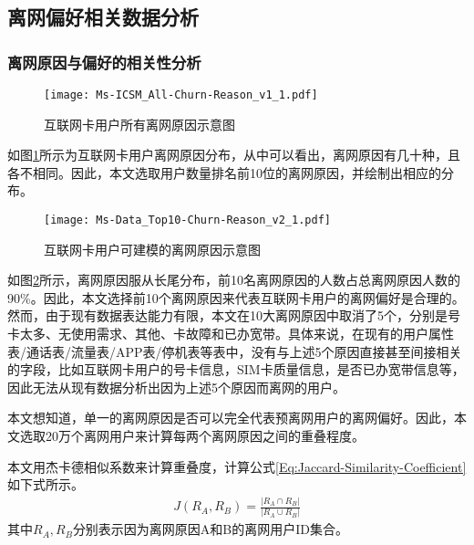 \subsection{离网偏好相关数据分析}
\subsubsection{离网原因与偏好的相关性分析}
\begin{figure}[!hbt]
	\centering
	\texttt{[image: Ms-ICSM\_All-Churn-Reason\_v1\_1.pdf]}
	\caption{互联网卡用户所有离网原因示意图}
	\label{Fig:All-Churn-Reason}
\end{figure}
如图\ref{Fig:All-Churn-Reason}所示为互联网卡用户离网原因分布，从中可以看出，离网原因有几十种，且各不相同。因此，本文选取用户数量排名前10位的离网原因，并绘制出相应的分布。

\begin{figure}[hbt]
	\centering
	\texttt{[image: Ms-Data\_Top10-Churn-Reason\_v2\_1.pdf]}
	\caption{互联网卡用户可建模的离网原因示意图}
	\label{Fig:ICSM-Top10-Churn-Reason}
\end{figure}
如图\ref{Fig:ICSM-Top10-Churn-Reason}所示，离网原因服从长尾分布，前10名离网原因的人数占总离网原因人数的90\%。因此，本文选择前10个离网原因来代表互联网卡用户的离网偏好是合理的。然而，由于现有数据表达能力有限，本文在10大离网原因中取消了5个，分别是号卡太多、无使用需求、其他、卡故障和已办宽带。具体来说，在现有的用户属性表/通话表/流量表/APP表/停机表等表中，没有与上述5个原因直接甚至间接相关的字段，比如互联网卡用户的号卡信息，SIM卡质量信息，是否已办宽带信息等，因此无法从现有数据分析出因为上述5个原因而离网的用户。


本文想知道，单一的离网原因是否可以完全代表预离网用户的离网偏好。因此，本文选取20万个离网用户来计算每两个离网原因之间的重叠程度。\par
本文用杰卡德相似系数来计算重叠度，计算公式\eqref{Eq:Jaccard-Similarity-Coefficient}如下式所示。
\begin{equation}
	\begin{aligned}
		J(R_{A}, R_{B}) = \frac{| R_{A} \cap R_{B} |}{| R_{A} \cup R_{B} |}
	\end{aligned}
	\label{Eq:Jaccard-Similarity-Coefficient}
\end{equation}
其中$R_{A},  R_{B}$分别表示因为离网原因A和B的离网用户ID集合。


